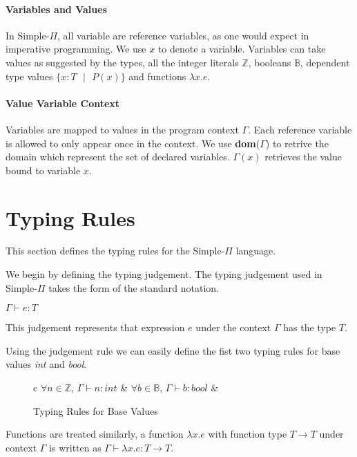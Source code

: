\documentclass[a4paper,12pt]{report}
\begin{document}
\paragraph{Variables and Values} In Simple-$\Pi$, all variable are reference 
variables, as one would expect in imperative programming. We use $x$ to denote a 
variable. Variables can take values as suggested by the types, all the integer 
literals $\mathbb{Z}$, booleans $\mathbb{B}$, dependent type values 
$\{x: T\text{ }|\text{ }P(x)\}$ and functions $\lambda x.e$.

\paragraph{Value Variable Context} Variables are mapped to values in the program 
context $\Gamma$. Each reference variable is allowed to only appear once in 
the context. We use \textbf{dom}($\Gamma$) to retrive the domain which represent 
the set of declared variables. $\Gamma(x)$ retrieves the value bound to variable 
$x$.

\section{Typing Rules}
This section defines the typing rules for the Simple-$\Pi$ language.

\par
We begin by defining the typing judgement. The typing judgement used in 
Simple-$\Pi$ takes the form of the standard notation. 
\begin{center}
  $\Gamma \vdash e : T$
\end{center}
This judgement represents that expression $e$ under the context $\Gamma$ has the 
type $T$.

\par
Using the judgement rule we can easily define the fist two typing rules for base 
values \textit{int} and \textit{bool}.

\begin{figure}[H]
  \begin{center}
    \begin{tabular} {c}
      $\forall n \in \mathbb{Z}$, $\Gamma \vdash n : int$ & 
      $\forall b \in \mathbb{B}$, $\Gamma \vdash b : bool$ &       
    \end{tabular}
  \end{center}
  \caption{Typing Rules for Base Values}
\end{figure}

\par
Functions are treated similarly, a function $\lambda x.e$ with function type 
$T \longrightarrow T$ under context $\Gamma$ is written as 
$\Gamma \vdash \lambda x.e : T \longrightarrow T$.
\end{document}
